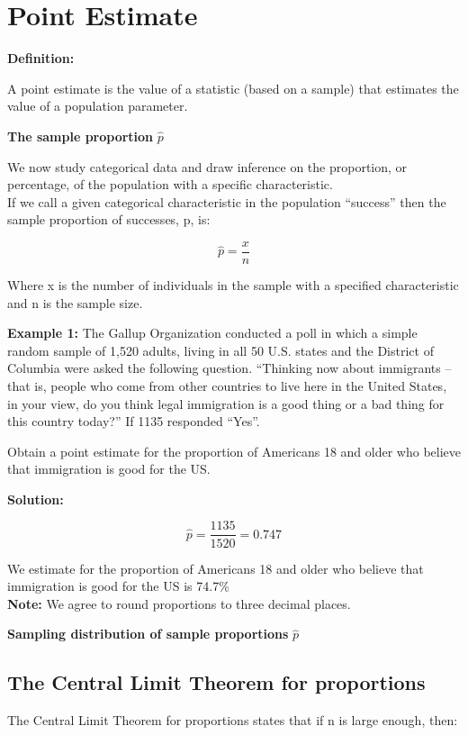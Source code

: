 \documentclass[
]{book}
\begin{document}
\section{Point Estimate}\label{point-estimate}

\textbf{Definition:}

A point estimate is the value of a statistic (based on a sample) that estimates the value of a population parameter.

\textbf{The sample proportion} \(\hat{p}\)

We now study categorical data and draw inference on the proportion, or percentage, of the population with a specific characteristic.\\
If we call a given categorical characteristic in the population ``success'' then the sample proportion of successes, p, is:

\[\hat{p}= \frac{x}{n} \]

Where x is the number of individuals in the sample with a specified characteristic and n is the sample size.

\textbf{Example 1:} The Gallup Organization conducted a poll in which a simple random sample of 1,520 adults, living in all 50 U.S. states and the District of Columbia were asked the following question. ``Thinking now about immigrants -- that is, people who come from other countries to live here in the United States, in your view, do you think legal immigration is a good thing or a bad thing for this country today?'' If 1135 responded ``Yes''.

Obtain a point estimate for the proportion of Americans 18 and older who believe that immigration is good for the US.

\textbf{Solution:}

\[\hat{p}= \frac{1135}{1520} = 0.747\]

We estimate for the proportion of Americans 18 and older who believe that immigration is good for the US is 74.7\%\\
\textbf{Note:} We agree to round proportions to three decimal places.

\textbf{Sampling distribution of sample proportions} \(\hat{p}\)

\subsection{The Central Limit Theorem for proportions}\label{the-central-limit-theorem-for-proportions}

The Central Limit Theorem for proportions states that if n is large enough, then:
\end{document}
